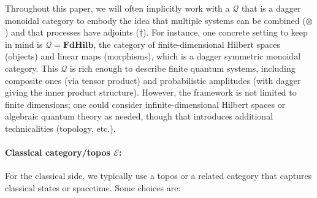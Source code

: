 \medskip

Throughout this paper, we will often implicitly work with a $\mathcal{Q}$ that is a dagger monoidal category to embody the idea that multiple systems can be combined ($\otimes$) and that processes have adjoints ($\dagger$). For instance, one concrete setting to keep in mind is $\mathcal{Q} = \mathbf{FdHilb}$, the category of finite-dimensional Hilbert spaces (objects) and linear maps (morphisms), which is a dagger symmetric monoidal category. This $\mathcal{Q}$ is rich enough to describe finite quantum systems, including composite ones (via tensor product) and probabilistic amplitudes (with dagger giving the inner product structure). However, the framework is not limited to finite dimensions; one could consider infinite-dimensional Hilbert spaces or algebraic quantum theory as needed, though that introduces additional technicalities (topology, etc.).

\paragraph{Classical category/topos $\mathcal{E}$:} 
For the classical side, we typically use a topos or a related category that captures classical states or spacetime. Some choices are:


